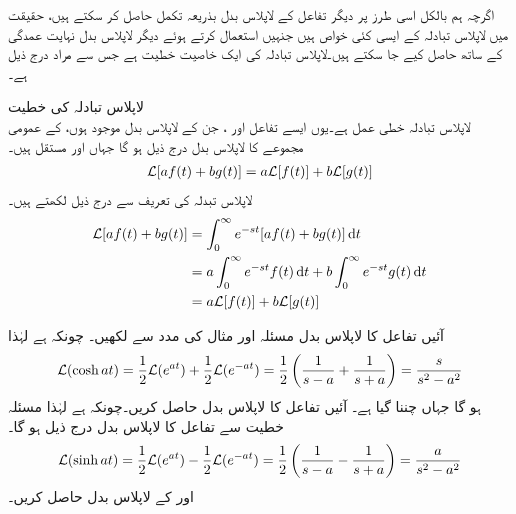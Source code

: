 اگرچہ ہم بالکل اسی طرز پر دیگر تفاعل کے لاپلاس بدل بذریعہ تکمل حاصل کر سکتے ہیں، حقیقت میں لاپلاس تبادلہ کے ایسی کئی خواص ہیں جنہیں استعمال کرتے ہوئے دیگر لاپلاس بدل نہایت عمدگی کے ساتھ حاصل کیے جا سکتے ہیں۔لاپلاس تبادلہ کی ایک خاصیت  خطیت ہے جس سے مراد درج ذیل ہے۔

\quad لاپلاس تبادلہ کی خطیت\\
لاپلاس تبادلہ خطی عمل ہے۔یوں ایسے تفاعل  اور ، جن کے لاپلاس بدل موجود ہوں، کے عمومی مجموعے کا لاپلاس بدل درج ذیل ہو گا جہاں  اور  مستقل ہیں۔
\begin{align*}
\mathcal{L}[af(t)+bg(t)]=a\mathcal{L}[f(t)]+b\mathcal{L}[g(t)]
\end{align*}
لاپلاس تبدلہ کی تعریف سے درج ذیل لکھتے ہیں۔
\begin{align*}
\Laplace[af(t)+bg(t)]&=\int_{0}^{\infty}e^{-st}[af(t)+bg(t)]\dif t\\
&=a\int_{0}^{\infty}e^{-st}f(t)\dif t+b\int_{0}^{\infty}e^{-st}g(t) \dif t\\
&=a\Laplace[f(t)]+b\Laplace[g(t)]
\end{align*}

آئیں تفاعل  کا لاپلاس بدل مسئلہ  اور مثال  کی مدد سے لکھیں۔
 چونکہ  ہے لہٰذا 
\begin{align*}
\mathcal{L}(\cosh at)=\frac{1}{2}\mathcal{L}(e^{at})+\frac{1}{2}\mathcal{L}(e^{-at})=\frac{1}{2}\left(\frac{1}{s-a}+\frac{1}{s+a}\right)=\frac{s}{s^2-a^2}
\end{align*}
ہو گا جہاں  چننا گیا ہے۔
آئیں تفاعل  کا لاپلاس بدل حاصل کریں۔چونکہ  ہے لہٰذا مسئلہ خطیت سے تفاعل کا لاپلاس بدل درج ذیل ہو گا۔
\begin{align*}
\mathcal{L}(\sinh at)=\frac{1}{2}\mathcal{L}(e^{at})-\frac{1}{2}\mathcal{L}(e^{-at})=\frac{1}{2}\left(\frac{1}{s-a}-\frac{1}{s+a}\right)=\frac{a}{s^2-a^2}
\end{align*}
 اور  کے لاپلاس بدل حاصل کریں۔


